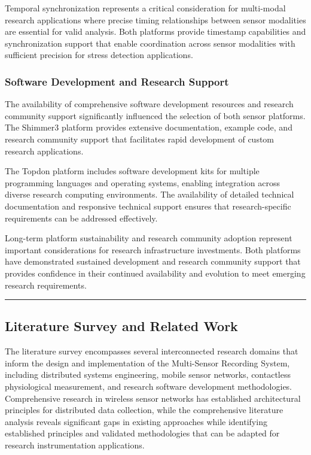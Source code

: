 \documentclass[12pt,a4paper]{article}
\begin{document}
Temporal synchronization represents a critical consideration for multi-modal research applications where precise timing
relationships between sensor modalities are essential for valid analysis. Both platforms provide timestamp capabilities
and synchronization support that enable coordination across sensor modalities with sufficient precision for stress
detection applications.

\subsubsection{Software Development and Research Support}

The availability of comprehensive software development resources and research community support significantly influenced
the selection of both sensor platforms. The Shimmer3 platform provides extensive documentation, example code, and
research community support that facilitates rapid development of custom research applications.

The Topdon platform includes software development kits for multiple programming languages and operating systems,
enabling integration across diverse research computing environments. The availability of detailed technical
documentation and responsive technical support ensures that research-specific requirements can be addressed effectively.

Long-term platform sustainability and research community adoption represent important considerations for research
infrastructure investments. Both platforms have demonstrated sustained development and research community support that
provides confidence in their continued availability and evolution to meet emerging research requirements.

\hrule

\subsection{Literature Survey and Related Work}

The literature survey encompasses several interconnected research domains that inform the design and implementation of
the Multi-Sensor Recording System, including distributed systems engineering, mobile sensor networks, contactless
physiological measurement, and research software development methodologies. Comprehensive research in wireless sensor
networks has established architectural principles for distributed data collection, while the comprehensive literature
analysis reveals significant gaps in existing approaches while identifying established principles and validated
methodologies that can be adapted for research instrumentation applications.
\end{document}
